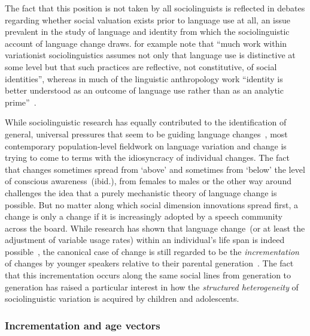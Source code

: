 The fact that this position is not taken by all sociolinguists is reflected in debates regarding whether social valuation exists prior to language use at all, an issue prevalent in the study of language and identity from which the sociolinguistic account of language change draws. \citeauthor{Bucholtz2004} for example note that ``much work within variationist sociolinguistics assumes not only that language use is distinctive at some level but that such practices are reflective, not constitutive, of social identities'', whereas in much of the linguistic anthropology work ``identity is better understood as an outcome of language use rather than as an analytic prime''~\citep[p.376]{Bucholtz2004}.

While sociolinguistic research has equally contributed to the identification of general, universal pressures that seem to be guiding language changes~\citep[see][for an extensive summary in relation to sound changes in particular]{Labov1994}, most contemporary population-level fieldwork on language variation and change is trying to come to terms with the idiosyncracy of individual changes. The fact that changes sometimes spread from `above' and sometimes from `below' the level of conscious awareness~(ibid.), from females to males or the other way around~\citep{Trudgill1972,Milroy1985,Eckert1989,Labov2001,Sundgren2001} challenges the idea that a purely mechanistic theory of language change is possible.
But no matter along which social dimension innovations spread first, a change is only a change if it is increasingly adopted by a speech community across the board. While research has shown that %
language change~(or at least the adjustment of variable usage rates) within an individual's life span is indeed possible~\citep{Sankoff2007,Buchstaller2015}, the canonical case of change is still regarded to be the \emph{incrementation} of changes by younger speakers relative to their parental generation~\citep{Labov2001,Tagliamonte2009}. The fact that this incrementation occurs along the same social lines from generation to generation has raised a particular interest in how the \emph{structured heterogeneity} of sociolinguistic variation is acquired by children and adolescents.

\subsubsection{Incrementation and age vectors}
\label{sec:agevector}


